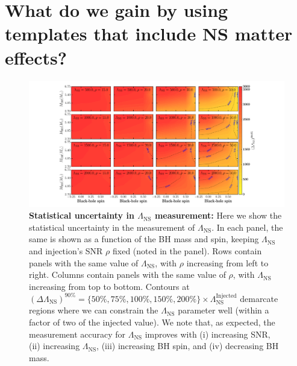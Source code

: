 \documentclass[aps,prd,amsmath,floats,floatfix, twocolumn,
superscriptaddress,nofootinbib,showpacs]{revtex4-1}
\newcommand{\lambdans}{\Lambda_\mathrm{NS}}
\begin{document}
\section{What do we gain by using templates that include NS matter effects?}\label{s1:PEwithNS}
\begin{figure}
\centering    
\includegraphics[trim=35 21 15 21 0,clip=true,width=2.2\columnwidth]{TTLambdaRawCIWidths90_0_Lambda_SNR}
\caption{{\bf Statistical uncertainty in $\lambdans$ measurement:}
Here we show the statistical uncertainty in the measurement of
$\lambdans$. In each panel, the
same is shown as a function of the BH mass and spin, keeping $\lambdans$ and
injection's SNR $\rho$ fixed (noted in the panel). Rows contain panels
with the same value of $\lambdans$, with $\rho$ increasing from left to right.
Columns contain panels with the same value of $\rho$, with $\lambdans$ 
increasing from top to bottom.
% 
Contours at $(\Delta\lambdans)^{90\%}=\{50\%, 75\%, 100\%, 150\%, 200\%\}\times\lambdans^\mathrm{Injected}$ demarcate regions where we can constrain the
$\lambdans$ parameter well (within a factor of two of the injected value).
% 
We note that, as expected, the measurement accuracy for $\lambdans$ improves
with (i) increasing SNR, (ii) increasing $\lambdans$, (iii) increasing BH spin,
and (iv) decreasing BH mass.
}
\label{fig:TT_LambdaCIWidths90_0_Lambda_SNR}
\end{figure}
\end{document}
